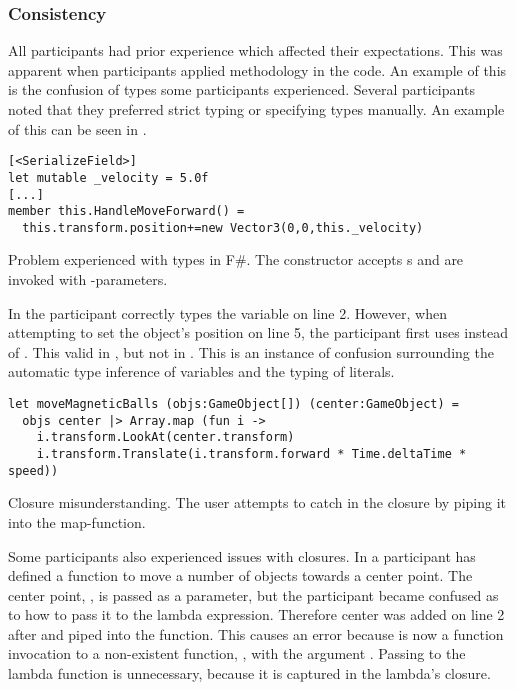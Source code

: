 \subsubsection{Consistency}\label{sec:part-cons} %
All participants had prior \cs experience which affected their expectations. This was apparent when participants applied \cs methodology in the \fs code. An example of this is the confusion of types some participants experienced. Several participants noted that they preferred strict typing or specifying types manually. An example of this can be seen in .

\begin{listing}[H]
\begin{verbatim}
[<SerializeField>]
let mutable _velocity = 5.0f
[...]
member this.HandleMoveForward() =
  this.transform.position+=new Vector3(0,0,this._velocity)
\end{verbatim}
\caption{Problem experienced with types in F\#. The  constructor accepts s and are invoked with -parameters.}
\label{lst:type-conf}
\end{listing}

In  the participant correctly types the  variable on line 2. However, when attempting to set the object's position on line 5, the participant first uses  instead of . This valid in \cs, but not in \fs. This is an instance of confusion surrounding the automatic type inference of variables and the typing of literals.

\begin{listing}[H]
\begin{verbatim}
let moveMagneticBalls (objs:GameObject[]) (center:GameObject) =
  objs center |> Array.map (fun i ->
    i.transform.LookAt(center.transform)
    i.transform.Translate(i.transform.forward * Time.deltaTime * speed))
\end{verbatim}
\caption{Closure misunderstanding. The user attempts to catch  in the closure by piping it into the map-function.}
\label{lst:clos-mis}
\end{listing}

Some participants also experienced issues with closures. In  a participant has defined a function to move a number of objects towards a center point. The center point, , is passed as a parameter, but the participant became confused as to how to pass it to the lambda expression. Therefore center was added on line 2 after  and piped into the  function. This causes an error because  is now a function invocation to a non-existent function, , with the argument . Passing  to the lambda function is unnecessary, because it is captured in the lambda's closure.

